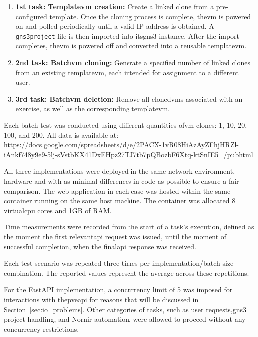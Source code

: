     

    \begin{enumerate}
        \item \textbf{1st task: Template\ac{vm} creation:} Create a linked clone from a pre-configured template. Once 
        the cloning process is complete, the\ac{vm} is powered on and polled periodically until a valid IP address is 
        obtained. A \texttt{gns3project} file is then imported into its\ac{gns3} instance. After the import completes, 
        the\ac{vm} is powered off and converted into a reusable template\ac{vm}.

        \item \textbf{2nd task: Batch\ac{vm} cloning:} Generate a specified number of linked clones from an existing template\ac{vm}, 
        each intended for assignment to a different user.

        \item \textbf{3rd task: Batch\ac{vm} deletion:} Remove all cloned\ac{vm}s associated with an exercise, as well as 
        the corresponding template\ac{vm}.

    \end{enumerate}

    Each batch test was conducted using different quantities of\ac{vm} clones: 1, 10, 20, 100, and 200. All data is available at: 
    \url{https://docs.google.com/spreadsheets/d/e/2PACX-1vR08HiAzAyZFhjHRZl-iAnkf748y9e9-5lj-sVstbKX41DxEHpz27TJ7tb7pQBozbF6Xtq-ktSnIE5_/pubhtml}
    

    All three implementations were deployed in the same network environment, hardware and with as minimal differences in code 
    as possible to ensure a fair comparison. The web application in each case was hosted within the same container running 
    on the same host machine. The container was allocated 8 virtual\ac{cpu} cores and 1GB of RAM.

    Time measurements were recorded from the start of a task's execution, defined as the moment the first relevant\ac{api} 
    request was issued, until the moment of successful completion, when the final\ac{api} response was received.

    Each test scenario was repeated three times per implementation/batch size combination. The reported values represent 
    the average across these repetitions.

    For the FastAPI implementation, a concurrency limit of 5 was imposed for interactions with the\ac{pve}\ac{api} for reasons 
    that will be discussed in Section~\ref{sec:io_problems}. 
    Other categories of tasks, such as user requests,\ac{gns3} project handling, and Nornir automation, were allowed to 
    proceed without any concurrency restrictions.

